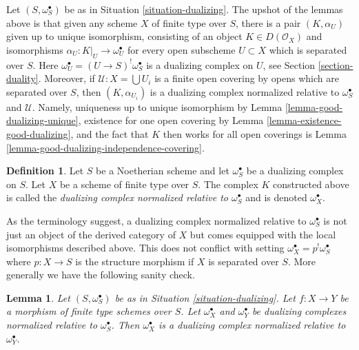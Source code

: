 \documentclass{stacks-project}
\theoremstyle{plain}
\newtheorem{lemma}[subsection]{Lemma}
\theoremstyle{definition}
\newtheorem{definition}[subsection]{Definition}
\theoremstyle{remark}
\numberwithin{equation}{subsection}
\begin{document}
\noindent
Let $(S, \omega_S^\bullet)$ be as in Situation \ref{situation-dualizing}.
The upshot of the lemmas above is that given any scheme $X$ of finite type
over $S$, there is a pair $(K, \alpha_U)$ given up to unique isomorphism,
consisting of an object $K \in D(\mathcal{O}_X)$ and isomorphisms
$\alpha_U : K|_U \to \omega_U^\bullet$ for every open subscheme
$U \subset X$ which is separated over $S$. Here
$\omega_U^\bullet = (U \to S)^!\omega_S^\bullet$ is a dualizing
complex on $U$, see Section \ref{section-duality}. Moreover, if
$\mathcal{U} : X = \bigcup U_i$ is a finite open covering
by opens which are separated over $S$, then
$(K, \alpha_{U_i})$ is a dualizing complex normalized relative to
$\omega_S^\bullet$ and $\mathcal{U}$.
Namely, uniqueness up to unique isomorphism by
Lemma \ref{lemma-good-dualizing-unique},
existence for one open covering by
Lemma \ref{lemma-existence-good-dualizing}, and
the fact that $K$ then works for all open coverings is
Lemma \ref{lemma-good-dualizing-independence-covering}.

\begin{definition}
\label{definition-good-dualizing}
Let $S$ be a Noetherian scheme and let $\omega_S^\bullet$ be a dualizing
complex on $S$. Let $X$ be a scheme of finite type over $S$.
The complex $K$ constructed above is called the
{\it dualizing complex normalized relative to $\omega_S^\bullet$}
and is denoted $\omega_X^\bullet$.
\end{definition}

\noindent
As the terminology suggest, a dualizing complex normalized relative to
$\omega_S^\bullet$ is not just an object of the derived category of $X$
but comes equipped with the local isomorphisms described above.
This does not conflict with setting
$\omega_X^\bullet = p^!\omega_S^\bullet$ where $p : X \to S$ is the
structure morphism if $X$ is separated over $S$. More generally
we have the following sanity check.

\begin{lemma}
\label{lemma-good-over-both}
Let $(S, \omega_S^\bullet)$ be as in Situation \ref{situation-dualizing}.
Let $f : X \to Y$ be a morphism of finite type schemes over $S$.
Let $\omega_X^\bullet$ and $\omega_Y^\bullet$ be dualizing complexes
normalized relative to $\omega_S^\bullet$. Then $\omega_X^\bullet$
is a dualizing complex normalized relative to $\omega_Y^\bullet$.
\end{lemma}
\end{document}
